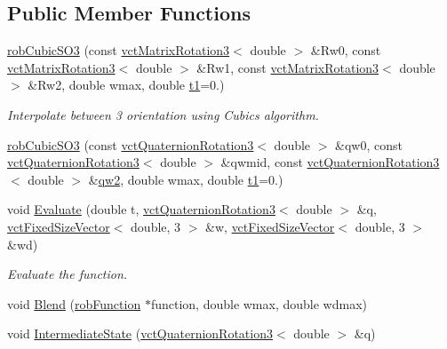 \subsection*{Public Member Functions}
\begin{DoxyCompactItemize}
\item 
\hyperlink{classrob_cubic_s_o3_aab3d72bf7bebf11c4840820b972382ea}{rob\+Cubic\+S\+O3} (const \hyperlink{classvct_matrix_rotation3}{vct\+Matrix\+Rotation3}$<$ double $>$ \&Rw0, const \hyperlink{classvct_matrix_rotation3}{vct\+Matrix\+Rotation3}$<$ double $>$ \&Rw1, const \hyperlink{classvct_matrix_rotation3}{vct\+Matrix\+Rotation3}$<$ double $>$ \&Rw2, double wmax, double \hyperlink{classrob_function_a9a4b408a3a5a8ae927caec3b6bac36ef}{t1}=0.)
\begin{DoxyCompactList}\small\item\em Interpolate between 3 orientation using Cubic\textquotesingle{}s algorithm. \end{DoxyCompactList}\item 
\hyperlink{classrob_cubic_s_o3_a3e972a72fb39186a29d5e0acb39be2e5}{rob\+Cubic\+S\+O3} (const \hyperlink{classvct_quaternion_rotation3}{vct\+Quaternion\+Rotation3}$<$ double $>$ \&qw0, const \hyperlink{classvct_quaternion_rotation3}{vct\+Quaternion\+Rotation3}$<$ double $>$ \&qwmid, const \hyperlink{classvct_quaternion_rotation3}{vct\+Quaternion\+Rotation3}$<$ double $>$ \&\hyperlink{classrob_function_s_o3_ae8f7673ef36c4dcf8af771af852b974d}{qw2}, double wmax, double \hyperlink{classrob_function_a9a4b408a3a5a8ae927caec3b6bac36ef}{t1}=0.)
\item 
void \hyperlink{classrob_cubic_s_o3_a75610e9d7a275e76782a7202d82c5142}{Evaluate} (double t, \hyperlink{classvct_quaternion_rotation3}{vct\+Quaternion\+Rotation3}$<$ double $>$ \&q, \hyperlink{classvct_fixed_size_vector}{vct\+Fixed\+Size\+Vector}$<$ double, 3 $>$ \&w, \hyperlink{classvct_fixed_size_vector}{vct\+Fixed\+Size\+Vector}$<$ double, 3 $>$ \&wd)
\begin{DoxyCompactList}\small\item\em Evaluate the function. \end{DoxyCompactList}\item 
void \hyperlink{classrob_cubic_s_o3_a2848a0e589ac6d9f098d0ec40835177b}{Blend} (\hyperlink{classrob_function}{rob\+Function} $\ast$function, double wmax, double wdmax)
\item 
void \hyperlink{classrob_cubic_s_o3_accc4251725d4adde202a252b5f841d0f}{Intermediate\+State} (\hyperlink{classvct_quaternion_rotation3}{vct\+Quaternion\+Rotation3}$<$ double $>$ \&q)
\end{DoxyCompactItemize}
